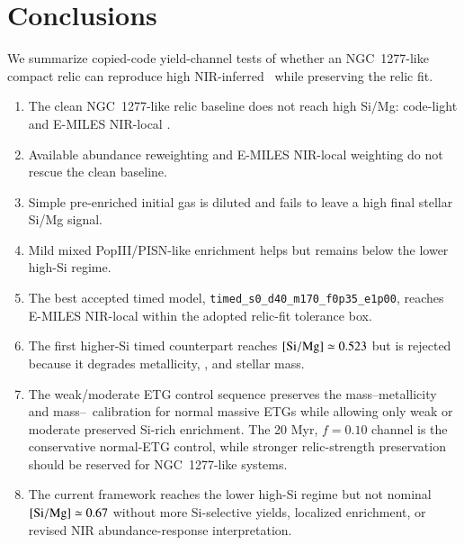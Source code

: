 \section{Conclusions}

We summarize copied-code yield-channel tests of whether an NGC~1277-like compact relic can reproduce high NIR-inferred \simg\ while preserving the relic fit.

\begin{enumerate}
\item The clean NGC~1277-like relic baseline does not reach high Si/Mg: code-light  and E-MILES NIR-local .
\item Available abundance reweighting and E-MILES NIR-local weighting do not rescue the clean baseline.
\item Simple pre-enriched initial gas is diluted and fails to leave a high final stellar Si/Mg signal.
\item Mild mixed PopIII/PISN-like enrichment helps but remains below the lower high-Si regime.
\item The best accepted timed model, \texttt{timed\_s0\_d40\_m170\_f0p35\_e1p00}, reaches E-MILES NIR-local  within the adopted relic-fit tolerance box.
\item The first higher-Si timed counterpart reaches $[\mathrm{Si}/\mathrm{Mg}]\simeq0.523$ but is rejected because it degrades metallicity, \mgfe, and stellar mass.
\item The weak/moderate ETG control sequence preserves the mass--metallicity and mass--\mgfe\ calibration for normal massive ETGs while allowing only weak or moderate preserved Si-rich enrichment. The 20 Myr, $f=0.10$ channel is the conservative normal-ETG control, while stronger relic-strength preservation should be reserved for NGC~1277-like systems.
\item The current framework reaches the lower high-Si regime but not nominal $[\mathrm{Si}/\mathrm{Mg}]\simeq0.67$ without more Si-selective yields, localized enrichment, or revised NIR abundance-response interpretation.
\end{enumerate}
